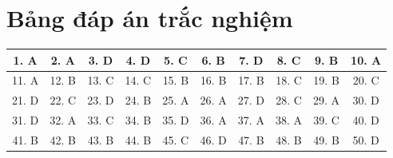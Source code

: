 \documentclass[12pt,a4paper]{article}
\begin{document}
\clearpage\section*{Bảng đáp án trắc nghiệm}
\begin{center}\begin{tabular}{|c|c|c|c|c|c|c|c|c|c|}
\hline
1. A & 2. A & 3. D & 4. D & 5. C & 6. B & 7. D & 8. C & 9. B & 10. A\\\hline
11. A & 12. B & 13. C & 14. C & 15. B & 16. B & 17. B & 18. C & 19. B & 20. C\\\hline
21. D & 22. C & 23. D & 24. B & 25. A & 26. A & 27. D & 28. C & 29. A & 30. D\\\hline
31. D & 32. A & 33. C & 34. B & 35. D & 36. A & 37. A & 38. A & 39. C & 40. D\\\hline
41. B & 42. B & 43. B & 44. B & 45. C & 46. D & 47. B & 48. B & 49. B & 50. D\\\hline
\end{tabular}\end{center}
\end{document}
